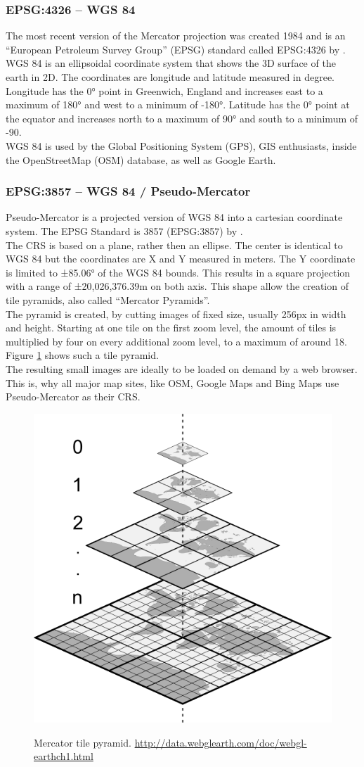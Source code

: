 \subsubsection{EPSG:4326 -- WGS 84}
The most recent version of the Mercator projection was created 1984 and is an \enquote{European Petroleum Survey Group} (EPSG) standard called EPSG:4326 by \cite{Decker1986}.\\
WGS 84 is an ellipsoidal coordinate system that shows the 3D surface of the earth in 2D. The coordinates are longitude and latitude measured in degree. Longitude has the 0° point in Greenwich, England and increases east to a maximum of 180° and west to a minimum of -180°. Latitude has the 0° point at the equator and increases north to a maximum of 90° and south to a minimum of -90.\\
WGS 84 is used by the Global Positioning System (GPS), GIS enthusiasts, inside the OpenStreetMap (OSM) database, as well as Google Earth.

\subsubsection{EPSG:3857 -- WGS 84 / Pseudo-Mercator}
Pseudo-Mercator is a projected version of WGS 84 into a cartesian coordinate system. The EPSG Standard is 3857 (EPSG:3857) by \cite{Grafarend1995}.\\
The CRS is based on a plane, rather then an ellipse. The center is identical to WGS 84 but the coordinates are X and Y measured in meters. The Y coordinate is limited to ±85.06° of the WGS 84 bounds. This results in a square projection with a range of ±20,026,376.39m on both axis. This shape allow the creation of tile pyramids, also called \enquote{Mercator Pyramids}. \\
The pyramid is created, by cutting images of fixed size, usually 256px in width and height. Starting at one tile on the first zoom level, the amount of tiles is multiplied by four on every additional zoom level, to a maximum of around 18. Figure \ref{img:mercator-pyramid} shows such a tile pyramid.\\
The resulting small images are ideally to be loaded on demand by a web browser. This is, why all major map sites, like OSM, Google Maps and Bing Maps use Pseudo-Mercator as their CRS.
\begin{figure}[H]
	\centering
	\includegraphics[width=0.4\columnwidth]{res/mercator-pyramid}\\
	\caption[]{Mercator tile pyramid. \url{http://data.webglearth.com/doc/webgl-earthch1.html}}
	\label{img:mercator-pyramid}
\end{figure}


